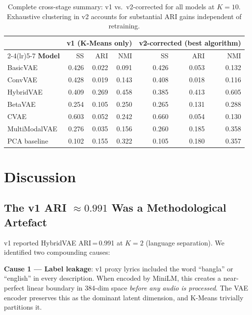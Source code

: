 \documentclass{article}
\begin{document}
\begin{table}[H]
\centering
\caption{Complete cross-stage summary: v1 vs.\ v2-corrected for all models at $K\!=\!10$.
Exhaustive clustering in v2 accounts for substantial ARI gains independent of retraining.}
\label{tab:crossstage}
\small
\begin{tabular}{lrrrrrr}
\toprule
 & \multicolumn{3}{c}{\textbf{v1 (K-Means only)}} &
   \multicolumn{3}{c}{\textbf{v2-corrected (best algorithm)}} \\
\cmidrule(lr){2-4}\cmidrule(lr){5-7}
\textbf{Model} & SS & ARI & NMI & SS & ARI & NMI \\
\midrule
BasicVAE       & 0.426 & 0.022 & 0.091 & 0.426 & 0.053 & 0.132 \\
ConvVAE        & 0.428 & 0.019 & 0.143 & 0.408 & 0.018 & 0.116 \\
HybridVAE      & 0.409 & 0.269 & 0.458 & 0.385 & 0.413 & 0.605 \\
BetaVAE        & 0.254 & 0.105 & 0.250 & 0.265 & 0.131 & 0.288 \\
CVAE           & 0.603 & 0.052 & 0.242 & 0.660 & 0.054 & 0.130 \\
MultiModalVAE  & 0.276 & 0.035 & 0.156 & 0.260 & 0.185 & 0.358 \\
\midrule\rowcolor{gray!15}
PCA baseline   & 0.102 & 0.155 & 0.322 & 0.105 & 0.180 & 0.357 \\
\bottomrule
\end{tabular}
\end{table}

\section{Discussion}
\label{sec:discussion}

\subsection{The v1 ARI $\approx 0.991$ Was a Methodological Artefact}

v1 reported HybridVAE ARI\,=\,0.991 at $K\!=\!2$ (language separation). We identified
two compounding causes:

\textbf{Cause 1 --- Label leakage}: v1 proxy lyrics included the word ``bangla'' or
``english'' in every description. When encoded by MiniLM, this creates a near-perfect
linear boundary in 384-dim space \emph{before any audio is processed}. The VAE encoder
preserves this as the dominant latent dimension, and K-Means trivially partitions it.
\end{document}
